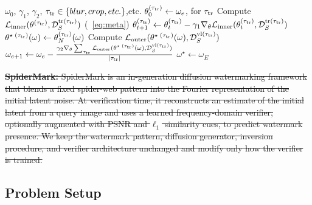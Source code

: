 {\color{blue}

\begin{algorithm}[t]
\caption{Meta-training framework}
\label{alg:meta-training_framework}
\begin{algorithmic}
\Require $\omega_0$, $\gamma_1$, $\gamma_2$, $\tau_{\rm tr} \in \{blur,  crop, etc.\}$,etc.
        \State$\theta^{(\tau_{\rm tr})}_0 \gets \omega_e$, for $\tau_{\rm tr}$
            \State Compute $\mathcal{L}_{\rm inner}(\theta^{(\tau_{\rm tr})},  \mathcal{D}^{{\rm tr}(\tau_{\rm tr})}_S)$ (~\cref{eq:meta})
            \State$\theta^{(\tau_{\rm tr})}_{t+1} \gets \theta^{(\tau_{\rm tr})}_t - \gamma_1 \nabla_\theta \mathcal{L}_{\rm inner}(\theta^{(\tau_{\rm tr})}_t,  \mathcal{D}^{{\rm tr}(\tau_{\rm tr})}_S)$
        \EndFor
        \State $\theta^{{\star}\;(\tau_{\rm tr})}(\omega)\gets \theta^{(\tau_{\rm tr})}_{N}(\omega)$
        \State Compute $\mathcal{L}_{\rm outer}(\theta^{{\star}\;(\tau_{\rm tr})}(\omega), \mathcal{D}^{{\rm vl}(\tau_{\rm tr})}_{S})$
    \EndFor
    \State $\omega_{e+1} \gets \omega_{e} - \frac{\gamma_2 \nabla_\theta \sum_{\tau_{\rm tr}}\mathcal{L}_{\rm outer}(\theta^{{\star}\;(\tau_{\rm tr})}(\omega), \mathcal{D}^{{\rm vl}(\tau_{\rm tr})}_{S})}{|\tau_{\rm tr}|}$
\EndFor
\State $\omega^{\star} \gets \omega_E$
\end{algorithmic}
\end{algorithm}

}

\sout{
\textbf{SpiderMark:}
SpiderMark is an in-generation diffusion watermarking framework that blends a fixed spider-web pattern into the Fourier representation of the initial latent noise.
At verification time, it reconstructs an estimate of the initial latent from a query image and uses a learned frequency-domain verifier, optionally augmented with PSNR and $\ell_1$ similarity cues, to predict watermark presence.
We keep the watermark pattern, diffusion generator, inversion procedure, and verifier architecture unchanged and modify only how the verifier is trained.
}


\subsection{Problem Setup}



